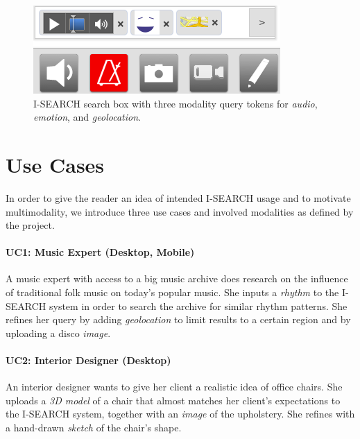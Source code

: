 \documentclass{sig-alternate}
\let\oldemph\emph
\renewcommand{\emph}[1]{\oldemph{\fontsize{9}{9}\selectfont #1}}
\begin{document}
\begin{figure}
\includegraphics[width=\columnwidth]{./resources/ui.png}
\caption{\mbox{I-SEARCH} search box with three modality query tokens for \emph{audio}, \emph{emotion}, and \emph{geolocation}.}
\label{fig:ui}
\vspace{-0.9em}
\end{figure}

\section{Use Cases} \label{sec:usecases}
In order to give the reader an idea of intended \mbox{I-SEARCH} usage and to motivate multimodality, we introduce three use cases and involved modalities as defined by the project.

\paragraph{UC1: Music Expert (Desktop, Mobile)}
A music expert with access to a big music archive does research on the influence of traditional folk music on today's popular music.
She inputs a \emph{rhythm} to the \mbox{I-SEARCH} system in order to search the archive for similar rhythm patterns.
She refines her query by adding \emph{geolocation} to limit results to a certain region and by uploading a disco \emph{image}.

\paragraph{UC2: Interior Designer (Desktop)}
An interior designer wants to give her client a realistic idea of office chairs.
She uploads a \emph{3D model} of a chair that almost matches her client's expectations to the \mbox{I-SEARCH} system, together with an \emph{image} of the upholstery.
She refines with a hand-drawn \emph{sketch} of the chair's shape.
\end{document}
